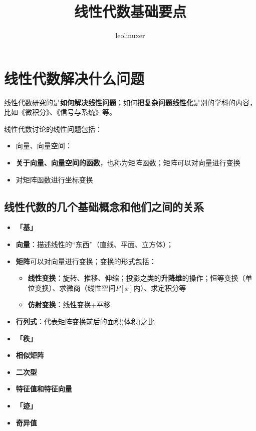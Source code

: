 \documentclass[12pt]{article}
\title{线性代数基础要点}
\author{leolinuxer}
\begin{document}
\maketitle
\tableofcontents

\section{线性代数解决什么问题\cite{Why_Learn_Linear_Algebra}}
线性代数研究的是\textbf{如何解决线性问题}；如何\textbf{把复杂问题线性化}是别的学科的内容，比如《微积分》、《信号与系统》等。

线性代数讨论的线性问题包括：
\begin{itemize}
\setlength{\itemsep}{0pt}
\setlength{\parsep}{0pt}
\setlength{\parskip}{0pt}
    \item 向量、向量空间：
    \item \textbf{关于向量、向量空间的函数}，也称为矩阵函数；矩阵可以对向量进行变换
    \item 对矩阵函数进行坐标变换
\end{itemize}

\subsection{线性代数的几个基础概念和他们之间的关系}
\begin{itemize}
\setlength{\itemsep}{0pt}
\setlength{\parsep}{0pt}
\setlength{\parskip}{0pt}
    \item \textbf{「基」}
    \item \textbf{向量}：描述线性的“东西”（直线、平面、立方体）；
    \item \textbf{矩阵}可以对向量进行变换；变换的形式包括：
    \begin{itemize}
    \setlength{\itemsep}{0pt}
    \setlength{\parsep}{0pt}
    \setlength{\parskip}{0pt}
        \item \textbf{线性变换}：旋转、推移、伸缩；投影之类的\textbf{升降维}的操作；恒等变换（单位变换）、求微商（线性空间$P[x]$内）、求定积分等
        \item \textbf{仿射变换}：线性变换+平移
    \end{itemize}
    \item \textbf{行列式}：代表矩阵变换前后的面积(体积)之比
    \item \textbf{「秩」}
    \item \textbf{相似矩阵}
    \item \textbf{二次型}
    \item \textbf{特征值和特征向量}
    \item \textbf{「迹」}
    \item \textbf{奇异值}
\end{itemize}
\end{document}
